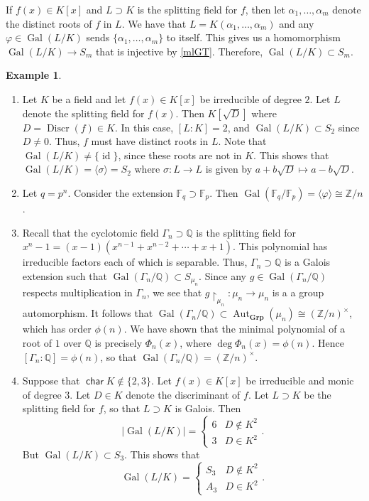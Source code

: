 \documentclass[10pt,letterpaper,cm]{nupset}
\theoremstyle{definition}
\newtheorem{exmp}[definition]{Example}
\theoremstyle{theorem}
\theoremstyle{remark}
\newcommand{\F}{\mathbb F}
\newcommand{\Q}{\mathbb Q}
\newcommand{\Z}{\mathbb Z}
\newcommand{\1}{\mathbf{1}}
\newcommand{\0}{\vec 0}
\DeclareMathOperator{\Char}{\mathsf{char}}
\DeclareMathOperator{\id}{id}
\DeclareMathOperator{\gal}{Gal}
\DeclareMathOperator{\aut}{Aut}
\DeclareMathOperator{\disc}{Discr}
\begin{document}
\smallskip

If $f(x) \in K[x]$ and $L \supset K$ is the splitting field for $f$, then let $\alpha_1, \ldots, \alpha_m$ denote the distinct roots of $f$ in $L$. We have that $L = K(\alpha_1, \ldots, \alpha_m)$ and any $\varphi \in \gal(L/K) $ sends $\{\alpha_1, \ldots, \alpha_m\}$ to itself. This gives us a homomorphism $\gal(L/K) \to S_m$ that is injective by \cref{mlGT}. Therefore, $\gal(L/K) \subset S_m$.



\begin{exmp} $ $
\begin{enumerate}
\item Let $K$ be a field and let $f(x) \in K[x]$ be irreducible of degree $2$. Let $L$ denote the splitting field for $f(x)$. Then $K[\sqrt{D}]$ where $D = \disc(f) \in K$. In this case, $[L:K] = 2$, and $\gal(L/K) \subset S_2$ since $D \ne 0$. Thus, $f$ must have distinct roots in $L$. Note that $\gal(L/K) \ne \{\id\}$, since these roots are not in $K$. This shows that $\gal(L/K) = \langle \sigma \rangle = S_2$ where $\sigma : L \to L$ is given by $a + b \sqrt{D} \mapsto a-b \sqrt{D}$.
\item Let $q=p^n$. Consider the extension $\F_q \supset \F_p$. Then $\gal(\F_q/\F_p) = \langle \varphi \rangle \cong \Z/n$.
\item Recall that the cyclotomic field $\Gamma_n \supset \Q$ is the splitting field for $x^n-1 = (x-1)(x^{n-1} + x^{n-2} + \cdots + x + 1)$. This polynomial has irreducible factors each of which is separable. Thus, $\Gamma_n \supset \Q$ is a Galois extension such that $\gal(\Gamma_n / \Q) \subset S_{\mu_n}$. Since any $g \in \gal(\Gamma_n/\Q)$ respects multiplication in $\Gamma_n$, we see that $g \restriction_{\mu_n} : \mu_n \to \mu_n$ is a a group automorphism. It follows that $\gal(\Gamma_n / \Q) \subset \aut_{\mathbf{Grp}}(\mu_n) \cong (\Z/n)^{\times}$, which has order $\phi(n)$.   We have shown that the minimal polynomial of a root of $1$ over $\Q$ is precisely $\Phi_n(x)$, where $\deg{\Phi_n(x)} = \phi(n)$. Hence $[\Gamma_n : \Q]= \phi(n)$, so that $\gal(\Gamma_n / \Q) = (\Z/n)^{\times}$.
\item Suppose that $\Char{K} \notin \{2,3\}$. Let $f(x) \in K[x]$ be irreducible and monic of degree $3$. Let $D \in K$ denote the discriminant of $f$. Let $L \supset K$ be the splitting field for $f$, so that $L \supset K$ is Galois. Then $$\left\lvert{\gal(L/K)}\right\rvert = \begin{cases} 6 & D \notin K^2  \\ 3 & D \in K^2    \end{cases}.$$ But $\gal(L/K) \subset S_3$. This shows that $$\gal(L/K) = \begin{cases} S_3 & D \notin K^2  \\ A_3 & D \in K^2    \end{cases}.$$
\end{enumerate}
\end{exmp}
\end{document}
